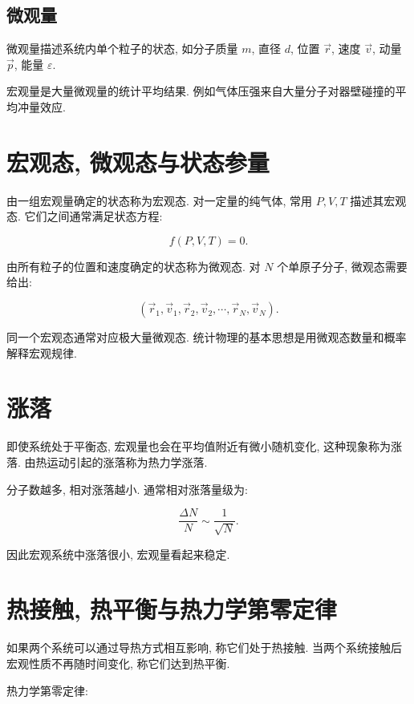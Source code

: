 \documentclass[
  a4paper,
]{ctexrep}
\begin{document}
\subsection{微观量}\label{ux5faeux89c2ux91cf}

微观量描述系统内单个粒子的状态, 如分子质量 \(m\), 直径 \(d\), 位置
\(\vec r\), 速度 \(\vec v\), 动量 \(\vec p\), 能量 \(\varepsilon\).

宏观量是大量微观量的统计平均结果.
例如气体压强来自大量分子对器壁碰撞的平均冲量效应.

\section{宏观态,
微观态与状态参量}\label{ux5b8fux89c2ux6001-ux5faeux89c2ux6001ux4e0eux72b6ux6001ux53c2ux91cf}

由一组宏观量确定的状态称为宏观态. 对一定量的纯气体, 常用 \(P,V,T\)
描述其宏观态. 它们之间通常满足状态方程:

\[
f(P,V,T)=0.
\]

由所有粒子的位置和速度确定的状态称为微观态. 对 \(N\) 个单原子分子,
微观态需要给出:

\[
(\vec r_1,\vec v_1,\vec r_2,\vec v_2,\cdots,\vec r_N,\vec v_N).
\]

同一个宏观态通常对应极大量微观态.
统计物理的基本思想是用微观态数量和概率解释宏观规律.

\section{涨落}\label{ux6da8ux843d}

即使系统处于平衡态, 宏观量也会在平均值附近有微小随机变化,
这种现象称为涨落. 由热运动引起的涨落称为热力学涨落.

分子数越多, 相对涨落越小. 通常相对涨落量级为:

\[
\frac{\Delta N}{N}\sim \frac{1}{\sqrt{N}}.
\]

因此宏观系统中涨落很小, 宏观量看起来稳定.

\section{热接触,
热平衡与热力学第零定律}\label{ux70edux63a5ux89e6-ux70edux5e73ux8861ux4e0eux70edux529bux5b66ux7b2cux96f6ux5b9aux5f8b}

如果两个系统可以通过导热方式相互影响, 称它们处于热接触.
当两个系统接触后宏观性质不再随时间变化, 称它们达到热平衡.

热力学第零定律:
\end{document}

